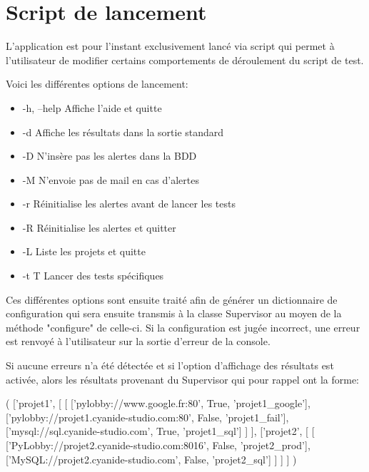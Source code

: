 \newpage

\section*{Script de lancement}

L'application est pour l'instant exclusivement lancé via script qui permet à l'utilisateur de modifier certains comportements de déroulement du script de test.

Voici les différentes options de lancement:

\begin{itemize}
\item -h, --help  Affiche l'aide et quitte
\item -d          Affiche les résultats dans la sortie standard
\item -D          N'insère pas les alertes dans la BDD
\item -M          N'envoie pas de mail en cas d'alertes
\item -r          Réinitialise les alertes avant de lancer les tests
\item -R          Réinitialise les alertes et quitter
\item -L          Liste les projets et quitte
\item -t T        Lancer des tests spécifiques
\end{itemize}


Ces différentes options sont ensuite traité afin de générer un dictionnaire de configuration qui sera ensuite transmis à la classe Supervisor au moyen de la méthode "configure" de celle-ci.
Si la configuration est jugée incorrect, une erreur est renvoyé à l'utilisateur sur la sortie d'erreur de la console.

Si aucune erreurs n'a été détectée et si l'option d'affichage des résultats est activée, alors les résultats provenant du Supervisor qui pour rappel ont la forme:

\begin{python}
(
    ['projet1', 
        [
            [
                ['pylobby://www.google.fr:80', True, 'projet1_google'],
                ['pylobby://projet1.cyanide-studio.com:80', False, 'projet1_fail'], 
                ['mysql://sql.cyanide-studio.com', True, 'projet1_sql']
            ]
        ], 
    ['projet2', 
        [
            [
                ['PyLobby://projet2.cyanide-studio.com:8016', False, 'projet2_prod'], 
                ['MySQL://projet2.cyanide-studio.com', False, 'projet2_sql']
            ]
        ]
    ]
)
\end{python} 

